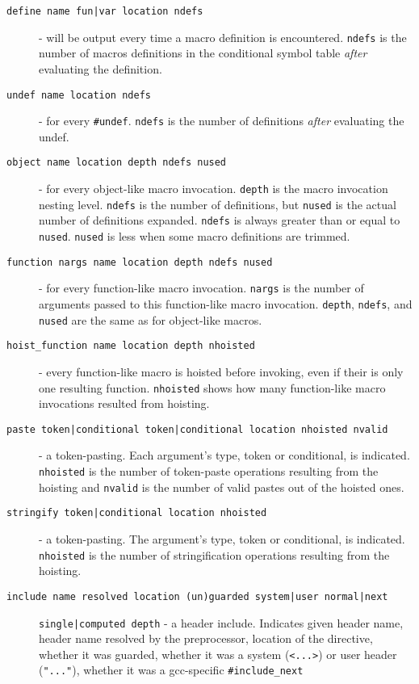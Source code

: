 \documentclass{article}
\begin{document}
\begin{description}
\item[\texttt{define name fun|var location ndefs}] - will be output every
  time a macro definition is encountered.  \verb"ndefs" is the number of
  macros definitions in the conditional symbol table \emph{after}
  evaluating the definition.
\item[\texttt{undef name location ndefs}] - for every \verb"#undef". \verb"ndefs" is the
  number of definitions \emph{after} evaluating the undef.
\item[\texttt{object name location depth ndefs nused}] - for every
  object-like macro invocation.  \verb"depth" is the macro invocation
  nesting level.  \verb"ndefs" is the number of definitions, but \verb"nused" is
  the actual number of definitions expanded.  \verb"ndefs" is always
  greater than or equal to \verb"nused".  \verb"nused" is less when some macro
  definitions are trimmed.
\item[\texttt{function nargs name location depth ndefs nused}] - for every
  function-like macro invocation.  \verb"nargs" is the number of arguments
  passed to this function-like macro invocation.  \verb"depth", \verb"ndefs",
  and \verb"nused" are the same as for object-like macros.
\item[\texttt{hoist\_function name location depth nhoisted}] - every function-like
  macro is hoisted before invoking, even if their is only one
  resulting function.  \verb"nhoisted" shows how many function-like macro
  invocations resulted from hoisting.
\item[\texttt{paste token|conditional token|conditional location
    nhoisted nvalid}] - a token-pasting.  Each argument's type, token
  or conditional, is indicated.  \verb"nhoisted" is the number of
  token-paste operations resulting from the hoisting and \verb"nvalid"
  is the number of valid pastes out of the hoisted ones.
\item[\texttt{stringify token|conditional location nhoisted}] - a
  token-pasting.  The argument's type, token or conditional, is
  indicated.  \verb"nhoisted" is the number of stringification operations
  resulting from the hoisting.
\item[\texttt{include name resolved location (un)guarded system|user
    normal|next}] \texttt{single|computed depth} - a header include.
  Indicates given header name, header name resolved by the
  preprocessor, location of the directive, whether it was guarded,
  whether it was a system (\verb"<...>") or user header
  (\verb'"..."'), whether it was a gcc-specific \verb"#include_next"

\end{description}
\end{document}
